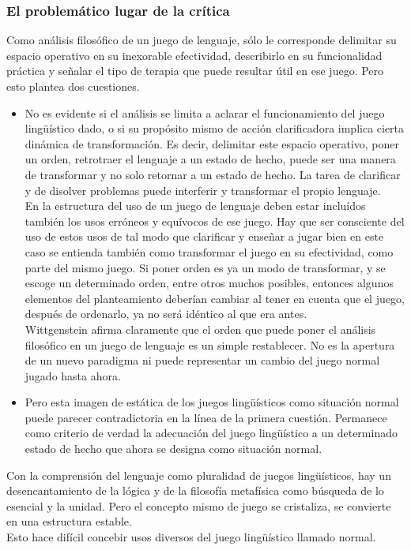 \documentclass[a4paper, 11pt, twocolumn, spanish]{article}
\begin{document}
\subsubsection{El problemático lugar de la crítica}
\label{sec:org5325641}
Como análisis filosófico de un juego de lenguaje, sólo le corresponde
delimitar su espacio operativo en su inexorable efectividad,
describirlo en su funcionalidad práctica y señalar el tipo de terapia
que puede resultar útil en ese juego. Pero esto plantea dos cuestiones.
\begin{itemize}
\item No es evidente si el análisis se limita a aclarar el
funcionamiento del juego lingüístico dado, o si su propósito mismo
de acción clarificadora implica cierta dinámica de
transformación. Es decir, delimitar este espacio operativo, poner
un orden, retrotraer el lenguaje a un estado de hecho, puede ser
una manera de transformar y no solo retornar a un estado de
hecho. La tarea de clarificar y de disolver problemas puede
interferir y transformar el propio lenguaje.\\

En la estructura del uso de un juego de lenguaje deben estar
incluídos también los usos erróneos y equívocos de ese juego. Hay
que ser consciente del uso de estos usos de tal modo que
clarificar y enseñar a jugar bien en este caso se entienda también
como transformar el juego en su efectividad, como parte del mismo
juego. Si poner orden es ya un modo de transformar, y se escoge un
determinado orden, entre otros muchos posibles, entonces algunos
elementos del planteamiento deberían cambiar al tener en cuenta
que el juego, después de ordenarlo, ya no será idéntico al que era
antes.\\

Wittgenstein afirma claramente que el orden que puede poner el
análisis filosófico en un juego de lenguaje es un simple
restablecer. No es la apertura de un nuevo paradigma ni puede
representar un cambio del juego normal jugado hasta ahora.

\item Pero esta imagen de estática de los juegos lingüísticos como
situación normal puede parecer contradictoria en la línea de la
primera cuestión. Permanece como criterio de verdad la adecuación
del juego lingüístico a un determinado estado de hecho que ahora
se designa como situación normal.
\end{itemize}

Con la comprensión del lenguaje como pluralidad de juegos
lingüísticos, hay un desencantamiento de la lógica y de la filosofía
metafísica como búsqueda de lo esencial y la unidad. Pero el concepto
mismo de juego se cristaliza, se convierte en una estructura
estable. \\
Esto hace difícil concebir usos diversos del juego lingüístico llamado
normal.
\end{document}
